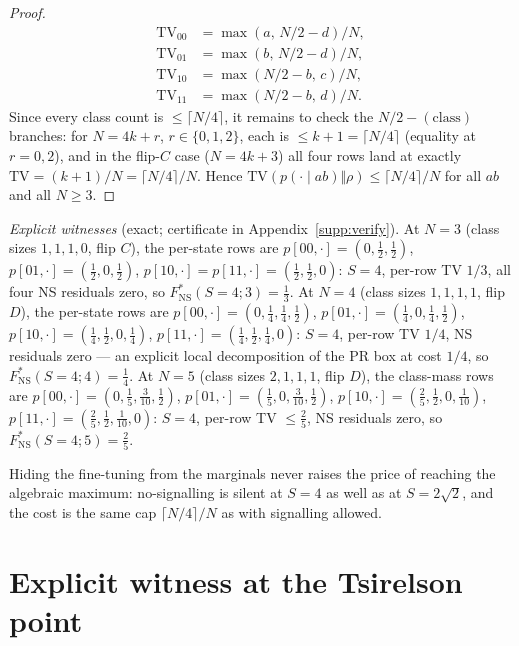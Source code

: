 \documentclass[aps,pra,reprint,superscriptaddress,floatfix]{revtex4-2}
\newcommand{\TV}{\mathrm{TV}}
\begin{document}
\begin{proof}
\begin{equation}
\begin{aligned}
\TV_{00} &= \max(a,\,N/2-d)/N,\\
\TV_{01} &= \max(b,\,N/2-d)/N,\\
\TV_{10} &= \max(N/2-b,\,c)/N,\\
\TV_{11} &= \max(N/2-b,\,d)/N.
\end{aligned}
\label{eq:ns4tv}
\end{equation}
Since every class count is $\le\lceil N/4\rceil$, it remains to check the
$N/2-(\mathrm{class})$ branches: for $N=4k+r$, $r\in\{0,1,2\}$, each is
$\le k+1=\lceil N/4\rceil$ (equality at $r=0,2$), and in the flip-$C$ case
($N=4k+3$) all four rows land at exactly $\TV=(k+1)/N
=\lceil N/4\rceil/N$. Hence $\TV(p(\cdot\mid ab)\Vert\rho)
\le\lceil N/4\rceil/N$ for all $ab$ and all $N\ge3$.
\end{proof}

\noindent
\emph{Explicit witnesses} (exact; certificate in Appendix~\ref{supp:verify}). At $N=3$ (class sizes $1,1,1,0$, flip $C$), the per-state rows
are $p[00,\cdot]=(0,\tfrac12,\tfrac12)$,
$p[01,\cdot]=(\tfrac12,0,\tfrac12)$,
$p[10,\cdot]=p[11,\cdot]=(\tfrac12,\tfrac12,0)$: $S=4$, per-row TV
$1/3$, all four NS residuals zero, so
$F^*_{\mathrm{NS}}(S{=}4;3)=\tfrac13$. At $N=4$ (class sizes $1,1,1,1$,
flip $D$), the per-state rows are
$p[00,\cdot]=(0,\tfrac14,\tfrac14,\tfrac12)$,
$p[01,\cdot]=(\tfrac14,0,\tfrac14,\tfrac12)$,
$p[10,\cdot]=(\tfrac14,\tfrac12,0,\tfrac14)$,
$p[11,\cdot]=(\tfrac14,\tfrac12,\tfrac14,0)$: $S=4$, per-row TV $1/4$,
NS residuals zero --- an explicit local decomposition of the PR box at
cost $1/4$, so $F^*_{\mathrm{NS}}(S{=}4;4)=\tfrac14$. At $N=5$ (class
sizes $2,1,1,1$, flip $D$), the class-mass rows are
$p[00,\cdot]=(0,\tfrac15,\tfrac{3}{10},\tfrac12)$,
$p[01,\cdot]=(\tfrac15,0,\tfrac{3}{10},\tfrac12)$,
$p[10,\cdot]=(\tfrac25,\tfrac12,0,\tfrac{1}{10})$,
$p[11,\cdot]=(\tfrac25,\tfrac12,\tfrac{1}{10},0)$: $S=4$, per-row TV
$\le\tfrac25$, NS residuals zero, so
$F^*_{\mathrm{NS}}(S{=}4;5)=\tfrac25$.

Hiding the fine-tuning from the marginals never raises the price of
reaching the algebraic maximum: no-signalling is silent at $S=4$ as well
as at $S=2\sqrt2$, and the cost is the same cap
$\lceil N/4\rceil/N$ as with signalling allowed.

\section{Explicit witness at the Tsirelson point}
\label{sec:witness}
\end{document}
